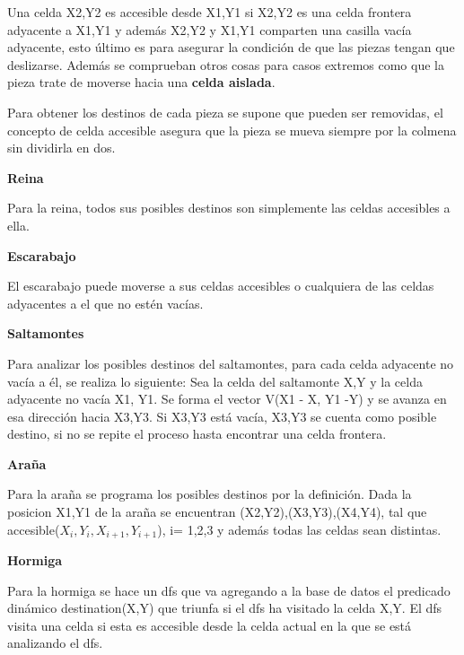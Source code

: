 \documentclass[12pt,letterpaper]{article}
\begin{document}
	Una celda X2,Y2 es accesible desde X1,Y1 si X2,Y2 es una celda frontera adyacente a X1,Y1 y adem\'as X2,Y2 y X1,Y1 comparten una casilla vac\'ia adyacente, esto \'ultimo es para asegurar la condici\'on de que las piezas tengan que deslizarse. Adem\'as se comprueban otros cosas para casos extremos como que la pieza trate de moverse hacia una \textbf{celda aislada}.
	
	Para obtener los destinos de cada pieza se supone que pueden ser removidas, el concepto de celda accesible asegura que la pieza se mueva siempre por la colmena sin dividirla en dos.
	
	\begin{flushleft}
		\textbf{Reina}
	\end{flushleft}
	Para la reina, todos sus posibles destinos son simplemente las celdas accesibles a ella.
	
	\begin{flushleft}
		\textbf{Escarabajo}
	\end{flushleft}
	El escarabajo puede moverse a sus celdas accesibles o cualquiera de las celdas adyacentes a el que no est\'en vac\'ias.
	
	\begin{flushleft}
		\textbf{Saltamontes}
	\end{flushleft}
	Para analizar los posibles destinos del saltamontes, para cada celda adyacente no vac\'ia a \'el, se realiza lo siguiente: Sea la celda del saltamonte X,Y y la celda adyacente no vac\'ia X1, Y1. Se forma el vector V(X1 - X, Y1 -Y) y se avanza en esa direcci\'on hacia X3,Y3. Si X3,Y3 est\'a vac\'ia, X3,Y3 se cuenta como posible destino, si no se repite el proceso hasta encontrar una celda frontera.
	\begin{flushleft}
		\textbf{Araña}
	\end{flushleft}
	Para la araña se programa los posibles destinos por la definici\'on. Dada la posicion X1,Y1 de la ara\~na se encuentran (X2,Y2),(X3,Y3),(X4,Y4), tal que accesible($X_i, Y_i, X_{i+1}, Y_{i + 1}$), i= 1,2,3 y adem\'as todas las celdas sean distintas. 

	\begin{flushleft}
	\textbf{Hormiga}
	\end{flushleft}
	Para la hormiga se hace un dfs que va agregando a la base de datos el predicado din\'amico destination(X,Y) que triunfa si el dfs ha visitado la celda X,Y. El dfs visita una celda si esta es accesible desde la celda actual en la que se est\'a analizando el dfs.
	
\end{document}
